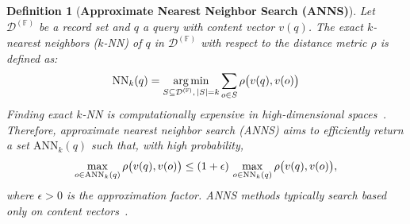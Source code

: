 \documentclass[numbers,sort]{article}
\newtheorem{definition}{Definition}
\begin{document}
\begin{definition}[\textbf{Approximate Nearest Neighbor Search (ANNS)}]
Let $\mathcal{D}^{(\mathbb{F})}$ be a record set and $q$ a query with content vector $v(q)$. The \emph{exact} $k$-nearest neighbors ($k$-NN) of $q$ in $\mathcal{D}^{(\mathbb{F})}$ with respect to the distance metric $\rho$ is defined as:
\begin{equation}
\small
    \mathrm{NN}_k(q) = \mathop{\arg\min}_{S \subseteq \mathcal{D}^{(\mathbb{F})},\, |S| = k} \sum_{o \in S} \rho\big(v(q), v(o)\big)
    \label{eq:exact_knn}
\end{equation}
Finding exact $k$-NN is computationally expensive in high-dimensional spaces~\cite{abbasifard2014survey, wang2021comprehensive}. Therefore, \emph{approximate} nearest neighbor search (ANNS) aims to efficiently return a set $\mathrm{ANN}_k(q)$ such that, with high probability,
\begin{equation}
\small
    \max_{o \in \mathrm{ANN}_k(q)} \rho\big(v(q), v(o)\big) \leq (1 + \epsilon)\, \max_{o \in \mathrm{NN}_k(q)} \rho\big(v(q), v(o)\big),
    \label{eq:approx_knn}
\end{equation}
where $\epsilon > 0$ is the approximation factor. ANNS methods typically search based only on content vectors~\cite{malkov2018efficient, douze2024faiss, annoy}.
\end{definition}
\end{document}
